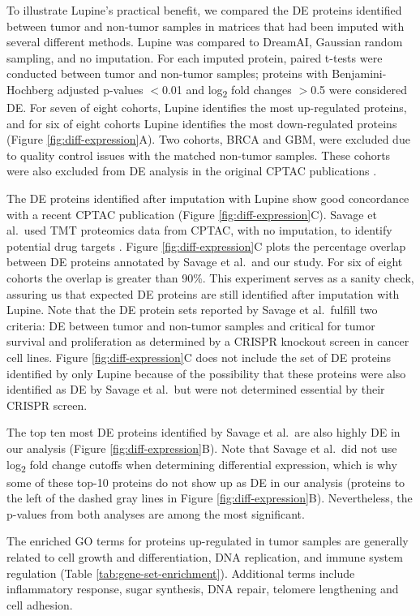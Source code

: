 \documentclass{article}
\begin{document}
To illustrate Lupine’s practical benefit, we compared the DE proteins identified between tumor and non-tumor samples in matrices that had been imputed with several different methods. Lupine was compared to DreamAI, Gaussian random sampling, and no imputation. For each imputed protein, paired t-tests were conducted between tumor and non-tumor samples; proteins with Benjamini-Hochberg adjusted p-values $<$0.01 and log\textsubscript{2} fold changes $>$0.5 were considered DE. For seven of eight cohorts, Lupine identifies the most up-regulated proteins, and for six of eight cohorts Lupine identifies the most down-regulated proteins (Figure \ref{fig:diff-expression}A). Two cohorts, BRCA and GBM, were excluded due to quality control issues with the matched non-tumor samples. These cohorts were also excluded from DE analysis in the original CPTAC publications \cite{krug-2020, savage-2024}. 

The DE proteins identified after imputation with Lupine show good concordance with a recent CPTAC publication (Figure \ref{fig:diff-expression}C). Savage et al.\ used TMT proteomics data from CPTAC, with no imputation, to identify potential drug targets \cite{savage-2024}. Figure \ref{fig:diff-expression}C plots the percentage overlap between DE proteins annotated by Savage et al.\ and our study. For six of eight cohorts the overlap is greater than 90\%. This experiment serves as a sanity check, assuring us that expected DE proteins are still identified after imputation with Lupine. Note that the DE protein sets reported by Savage et al.\ fulfill two criteria: DE between tumor and non-tumor samples and critical for tumor survival and proliferation as determined by a CRISPR knockout screen in cancer cell lines. Figure \ref{fig:diff-expression}C does not include the set of DE proteins identified by only Lupine because of the possibility that these proteins were also identified as DE by Savage et al.\ but were not determined essential by their CRISPR screen.

The top ten most DE proteins identified by Savage et al.\ are also highly DE in our analysis (Figure \ref{fig:diff-expression}B). Note that Savage et al.\ did not use log\textsubscript{2} fold change cutoffs when determining differential expression, which is why some of these top-10 proteins do not show up as DE in our analysis (proteins to the left of the dashed gray lines in Figure \ref{fig:diff-expression}B). Nevertheless, the p-values from both analyses are among the most significant. 

The enriched GO terms for proteins up-regulated in tumor samples are generally related to cell growth and differentiation, DNA replication, and immune system regulation (Table \ref{tab:gene-set-enrichment}). Additional terms include inflammatory response, sugar synthesis, DNA repair, telomere lengthening and cell adhesion. 
\end{document}
